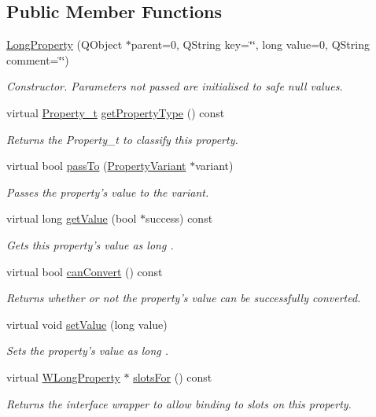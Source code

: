 \subsection*{Public Member Functions}
\begin{DoxyCompactItemize}
\item 
\hyperlink{class_long_property_a9c4b842a60dce4d158af82e74d877492}{Long\-Property} (Q\-Object $\ast$parent=0, Q\-String key=\char`\"{}\char`\"{}, long value=0, Q\-String comment=\char`\"{}\char`\"{})
\begin{DoxyCompactList}\small\item\em Constructor. Parameters not passed are initialised to safe null values. \end{DoxyCompactList}\item 
virtual \hyperlink{group___property_classes_ga38f1ccddda12c7cb50b868c9f789ee37}{Property\-\_\-t} \hyperlink{class_long_property_a896acbfd359960cf26185c278b6ed85a}{get\-Property\-Type} () const 
\begin{DoxyCompactList}\small\item\em Returns the Property\-\_\-t to classify this property. \end{DoxyCompactList}\item 
virtual bool \hyperlink{class_long_property_ac74b939a16df760aaedd2057a58568d1}{pass\-To} (\hyperlink{class_property_variant}{Property\-Variant} $\ast$variant)
\begin{DoxyCompactList}\small\item\em Passes the property's value to the variant. \end{DoxyCompactList}\item 
virtual long \hyperlink{class_long_property_a6340f40f5db6887ecef15842faddbc58}{get\-Value} (bool $\ast$success) const 
\begin{DoxyCompactList}\small\item\em Gets this property's value as long . \end{DoxyCompactList}\item 
virtual bool \hyperlink{class_long_property_a0ae32c7376a8a19ac6ac3010c7143f75}{can\-Convert} () const 
\begin{DoxyCompactList}\small\item\em Returns whether or not the property's value can be successfully converted. \end{DoxyCompactList}\item 
virtual void \hyperlink{class_long_property_ad39da450d5291d57af3216dfc5008c28}{set\-Value} (long value)
\begin{DoxyCompactList}\small\item\em Sets the property's value as long . \end{DoxyCompactList}\item 
virtual \hyperlink{class_w_long_property}{W\-Long\-Property} $\ast$ \hyperlink{class_long_property_a0819c723cc3341f44390bb8e4a88d509}{slots\-For} () const 
\begin{DoxyCompactList}\small\item\em Returns the interface wrapper to allow binding to slots on this property. \end{DoxyCompactList}\end{DoxyCompactItemize}

